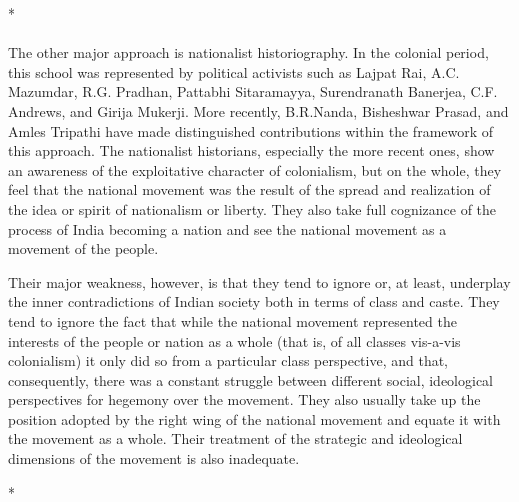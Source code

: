 \begin{center}*\end{center}

\paragraph*{}
The other major approach is nationalist historiography. In the colonial period, this school was represented by political activists such as Lajpat Rai, A.C. Mazumdar, R.G. Pradhan, Pattabhi Sitaramayya, Surendranath Banerjea, C.F. Andrews, and Girija Mukerji. More recently, B.R.Nanda, Bisheshwar Prasad, and Amles Tripathi have made distinguished contributions within the framework of this approach. The nationalist historians, especially the more recent ones, show an awareness of the exploitative character of colonialism, but on the whole, they feel that the national movement was the result of the spread and realization of the idea or spirit of nationalism or liberty. They also take full cognizance of the process of India becoming a nation and see the national movement as a movement of the people.

Their major weakness, however, is that they tend to ignore or, at least, underplay the inner contradictions of Indian society both in terms of class and caste. They tend to ignore the fact that while the national movement represented the interests of the people or nation as a whole (that is, of all classes vis-a-vis colonialism) it only did so from a particular class perspective, and that, consequently, there was a constant struggle between different social, ideological perspectives for hegemony over the movement. They also usually take up the position adopted by the right wing of the national movement and equate it with the movement as a whole. Their treatment of the strategic and ideological dimensions of the movement is also inadequate.

\begin{center}*\end{center}

